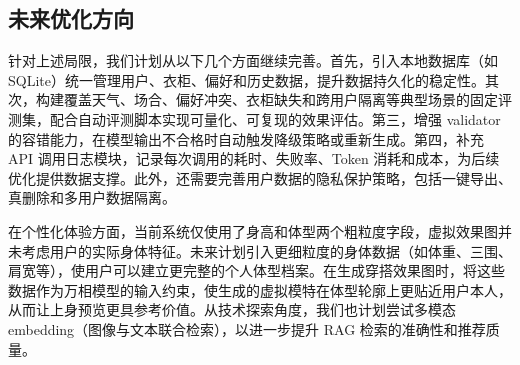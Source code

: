 \documentclass{applemlr}
\begin{document}
\subsection{未来优化方向}

针对上述局限，我们计划从以下几个方面继续完善。首先，引入本地数据库（如 SQLite）统一管理用户、衣柜、偏好和历史数据，提升数据持久化的稳定性。其次，构建覆盖天气、场合、偏好冲突、衣柜缺失和跨用户隔离等典型场景的固定评测集，配合自动评测脚本实现可量化、可复现的效果评估。第三，增强 validator 的容错能力，在模型输出不合格时自动触发降级策略或重新生成。第四，补充 API 调用日志模块，记录每次调用的耗时、失败率、Token 消耗和成本，为后续优化提供数据支撑。此外，还需要完善用户数据的隐私保护策略，包括一键导出、真删除和多用户数据隔离。

在个性化体验方面，当前系统仅使用了身高和体型两个粗粒度字段，虚拟效果图并未考虑用户的实际身体特征。未来计划引入更细粒度的身体数据（如体重、三围、肩宽等），使用户可以建立更完整的个人体型档案。在生成穿搭效果图时，将这些数据作为万相模型的输入约束，使生成的虚拟模特在体型轮廓上更贴近用户本人，从而让上身预览更具参考价值。从技术探索角度，我们也计划尝试多模态 embedding（图像与文本联合检索），以进一步提升 RAG 检索的准确性和推荐质量。




\end{document}
